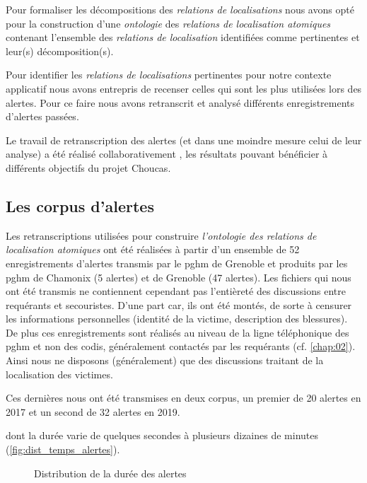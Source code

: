 Pour formaliser les décompositions des \emph{relations de
  localisations} nous avons opté pour la construction d'une
\emph{ontologie} des \emph{relations de localisation atomiques}
contenant l'ensemble des \emph{relations de localisation} identifiées
comme pertinentes et leur(s) décomposition(s).


Pour identifier les \emph{relations de localisations} pertinentes pour
notre contexte applicatif nous avons entrepris de recenser celles qui
sont les plus utilisées lors des alertes. Pour ce faire nous avons
retranscrit et analysé différents enregistrements d'alertes passées.

Le travail de retranscription des alertes (et dans une moindre mesure
celui de leur analyse) a été réalisé collaborativement
\autocite{Bunel2019}, les résultats pouvant bénéficier à différents
objectifs du projet Choucas.

\subsection{Les corpus d'alertes}

Les retranscriptions utilisées pour construire \emph{l'ontologie des
  relations de localisation atomiques} ont été réalisées à partir d'un
ensemble de 52 enregistrements d'alertes transmis par le \ac{pghm} de
Grenoble et produits par les \ac{pghm} de Chamonix (5 alertes) et de
Grenoble (47 alertes).
%
Les fichiers qui nous ont été transmis ne contiennent cependant pas
l'entièreté des discussions entre requérants et secouristes. D'une
part car, ils ont été montés, de sorte à censurer les informations
personnelles (\eg identité de la victime, description des
blessures). De plus ces enregistrements sont réalisés au niveau de la
ligne téléphonique des \ac{pghm} et non des \ac{codis}, généralement
contactés par les requérants (cf. \autoref{chap:02}). Ainsi nous ne
disposons (généralement) que des discussions traitant de la
localisation des victimes.

Ces dernières nous ont été transmises en deux corpus, un premier de 20
alertes en 2017 et un second de 32 alertes en 2019.

dont la durée varie de quelques secondes à plusieurs dizaines de
minutes (\autoref{fig:dist_temps_alertes}).

\begin{figure}
  \centering
  
  \caption{Distribution de la durée des alertes}
  \label{fig:dist_temps_alertes}
\end{figure}

